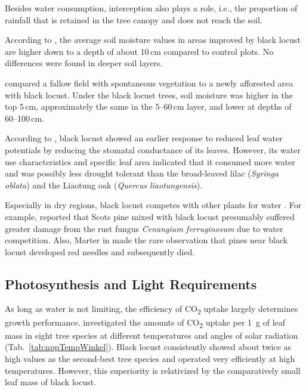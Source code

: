 Besides water consumption, interception also plays a role, i.e., the proportion of rainfall that is retained in the tree canopy and does not reach the soil.

According to \citet{gemeinhardt1959robinie}, the average soil moisture values in areas improved by black locust are higher down to a depth of about 10\,cm compared to control plots. No differences were found in deeper soil layers.

\citet{kou2016robinieBoden} compared a fallow field with spontaneous vegetation to a newly afforested area with black locust. Under the black locust trees, soil moisture was higher in the top 5\,cm, approximately the same in the 5--60\,cm layer, and lower at depths of 60--100\,cm.

According to \citet{yan2009robinieVergleich}, black locust showed an earlier response to reduced leaf water potentials by reducing the stomatal conductance of its leaves. However, its water use characteristics and specific leaf area indicated that it consumed more water and was possibly less drought tolerant than the broad-leaved lilac (\emph{Syringa oblata}) and the Liaotung oak (\emph{Quercus liaotungensis}).

Especially in dry regions, black locust competes with other plants for water \citep{halasz2021robinieAlsTierutter}. For example, \citet[p.~96]{donaubauer1974kiefernsterben} reported that Scots pine mixed with black locust presumably suffered greater damage from the rust fungus \emph{Cenangium ferruginosum} due to water competition. Also, Marter in \citet[p.~93]{erteld1952robinieErtrag} made the rare observation that pines near black locust developed red needles and subsequently died.

\subsection{Photosynthesis and Light Requirements}

As long as water is not limiting, the efficiency of CO\textsubscript{2} uptake largely determines growth performance. \citet{lubimenko1906npp} investigated the amounts of CO\textsubscript{2} uptake per \SI{1}{\gram} of leaf mass in eight tree species at different temperatures and angles of solar radiation (Tab.~\ref{tab:nppTempWinkel}). Black locust consistently showed about twice as high values as the second-best tree species and operated very efficiently at high temperatures. However, this superiority is relativized by the comparatively small leaf mass of black locust.


